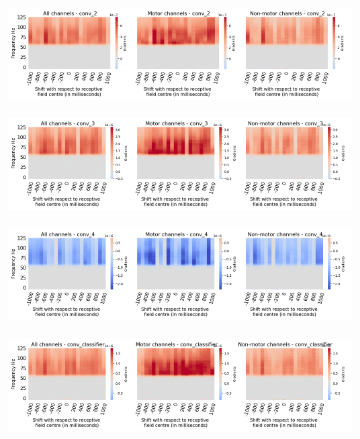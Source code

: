 \begin{figure}[!htpb]
\centering
\begin{subfigure}[b]{\textwidth}
   \includegraphics[width=0.85\linewidth]{img/appendix/C/hp-m/absVel/sbp0_hp_m_shift_gradients_conv_2_all_kinds}
   \caption{}
   \label{fig:absVel-hp-shifting-grads-conv-2}
\end{subfigure}

\begin{subfigure}[b]{\textwidth}
   \includegraphics[width=0.85\linewidth]{img/appendix/C/hp-m/absVel/sbp0_hp_m_shift_gradients_conv_3_all_kinds}
   \caption{}
   \label{fig:absVel-hp-shifting-grads-conv-3}
\end{subfigure}

\begin{subfigure}[b]{\textwidth}
   \includegraphics[width=0.85\linewidth]{img/appendix/C/hp-m/absVel/sbp0_hp_m_shift_gradients_conv_4_all_kinds}
   \caption{}
   \label{fig:absVel-hp-shifting-grads-conv-4}
\end{subfigure}

\begin{subfigure}[b]{\textwidth}
   \includegraphics[width=0.85\linewidth]{img/appendix/C/hp-m/absVel/sbp0_hp_m_shift_gradients_conv_classifier_all_kinds}
   \caption{}
   \label{fig:absVel-hp-shifting-grads-conv-classifier}
\end{subfigure}


\end{figure}
